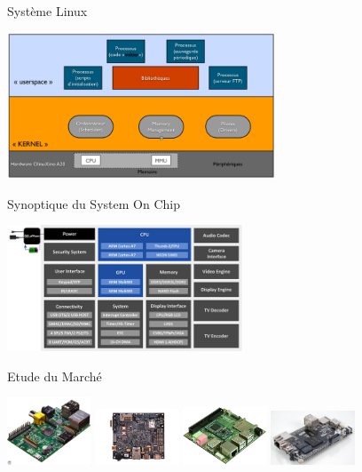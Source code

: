 \documentclass[11pt]{beamer}
\begin{document}
	\begin{frame}[label=Linux]{Système Linux}
	 \begin{center}
		\includegraphics[width=8cm]{common/kernel.png}
	 \end{center}
	\hyperlink{Kernel}{}
	\end{frame}
	
	\begin{frame}[label=SoC]{Synoptique du System On Chip}
	 \begin{center}
		\includegraphics[width=7cm]{common/SoC.png}
	 \end{center}
	\hyperlink{choix}{}
	\end{frame}
	
	
	\begin{frame}[label=SbC_2]{Etude du Marché}
	 \begin{center}
		\includegraphics[width=2.5cm]{common/rpi.jpg}
		\includegraphics[width=2.5cm]{common/Panda.png}
		\includegraphics[width=2.5cm]{common/odroid.jpg}
		\includegraphics[width=2.5cm]{common/Cubieboard.jpeg}
	 \end{center}
	\hyperlink{choix}{}
	\end{frame}
	
\end{document}
